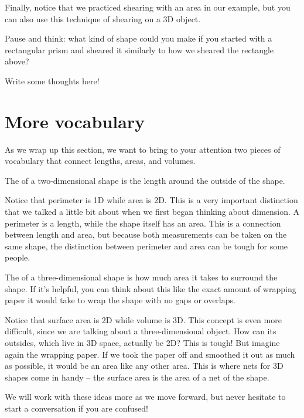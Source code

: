 \documentclass{ximera}
\begin{document}
Finally, notice that we practiced shearing with an area in our example, but you can also use this technique of shearing on a 3D object.
\begin{question}
Pause and think: what kind of shape could you make if you started with a rectangular prism and sheared it similarly to how we sheared the rectangle above?
\begin{freeResponse}
Write some thoughts here!
\end{freeResponse}
\end{question}




\section{More vocabulary}

As we wrap up this section, we want to bring to your attention two pieces of vocabulary that connect lengths, areas, and volumes.
\begin{definition}
The  of a two-dimensional shape is the length around the outside of the shape.
\end{definition}

Notice that perimeter is 1D while area is 2D. This is a very important distinction that we talked a little bit about when we first began thinking about dimension. A perimeter is a length, while the shape itself has an area. This is a connection between length and area, but because both measurements can be taken on the same shape, the distinction between perimeter and area can be tough for some people.

\begin{definition}
The  of a three-dimensional shape is how much area it takes to surround the shape. If it's helpful, you can think about this like the exact amount of wrapping paper it would take to wrap the shape with no gaps or overlaps.
\end{definition}
Notice that surface area is 2D while volume is 3D. This concept is even more difficult, since we are talking about a three-dimensional object. How can its outsides, which live in 3D space, actually be 2D? This is tough! But imagine again the wrapping paper. If we took the paper off and smoothed it out as much as possible, it would be an area like any other area. This is where nets for 3D shapes come in handy -- the surface area is the area of a net of the shape.

We will work with these ideas more as we move forward, but never hesitate to start a conversation if you are confused!
\end{document}
